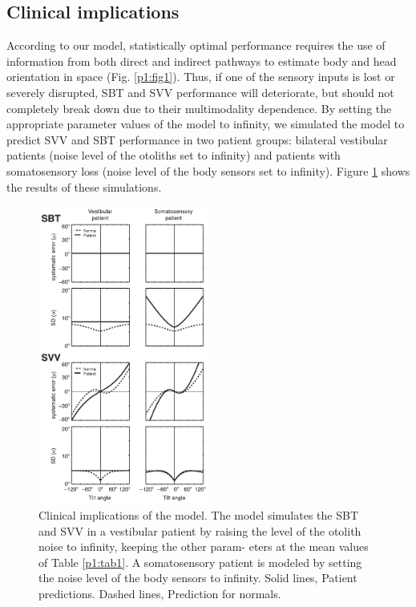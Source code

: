 \subsection{Clinical implications}
 
According to our model, statistically optimal performance requires the use of information from both direct and indirect pathways to estimate body and head orientation in space (Fig. \ref{p1:fig1}). Thus, if one of the sensory inputs is lost or severely disrupted, SBT and SVV performance will deteriorate, but should not completely break down due to their multimodality dependence. By setting the appropriate parameter values of the model to infinity, we simulated the model to predict SVV and SBT performance in two patient groups: bilateral vestibular patients (noise level of the otoliths set to infinity) and patients with somatosensory loss (noise level of the body sensors set to infinity). Figure \ref{p1:fig7} shows the results of these simulations. 

\begin{figure}
    \includegraphics[width=0.5\textwidth]{src/paper1/figure7.pdf}
    
    \caption{Clinical implications of the model. The model simulates the SBT and SVV in a vestibular patient by raising the level of the otolith noise to infinity, keeping the other param- eters at the mean values of Table \ref{p1:tab1}. A somatosensory patient is modeled by setting the noise level of the body sensors to infinity. Solid lines, Patient predictions. Dashed lines, Prediction for normals.}
    \label{p1:fig7}
\end{figure}

